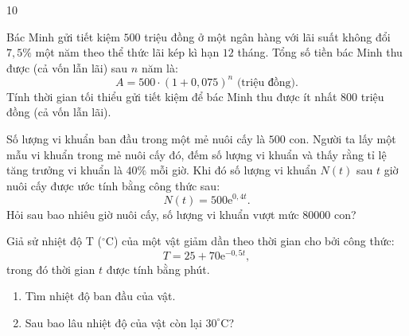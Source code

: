 \begin{indapan}{10}
\begin{bt}
	Bác Minh gửi tiết kiệm $500$ triệu đồng ở một ngân hàng với lãi suất không đổi $7{,}5 \%$ một năm theo thể thức lãi kép kì hạn $12$ tháng. Tổng số tiền bác Minh thu được (cả vốn lẫn lãi) sau $n$ năm là:
	$$A=500 \cdot(1+0{,}075)^n \text { (triệu đồng).}$$
	Tính thời gian tối thiểu gửi tiết kiệm để bác Minh thu được ít nhất $800$ triệu đồng (cả vốn lẫn lãi).
\end{bt}	

\begin{bt}
	Số lượng vi khuẩn ban đầu trong một mẻ nuôi cấy là $500$ con. Người ta lấy một mẫu vi khuẩn trong mẻ nuôi cấy đó, đếm số lượng vi khuẩn và thấy rằng tỉ lệ tăng trưởng vi khuẩn là $40 \%$ mỗi giờ. Khi đó số lượng vi khuẩn $N(t)$ sau $t$ giờ nuôi cấy được ước tính bằng công thức sau:
	$$N(t)=500\mathrm{e}^{0{,}4t}.$$
	Hỏi sau bao nhiêu giờ nuôi cấy, số lượng vi khuẩn vượt mức $80000$ con?
\end{bt}

\begin{bt}
	Giả sử nhiệt độ T ($^{\circ}$C) của một vật giảm dần theo thời gian cho bởi công thức:
	$$T=25+70\mathrm{e}^{-0{,}5t},$$ trong đó thời gian $t$ được tính bằng phút.
	\begin{enumerate}
		\item Tìm nhiệt độ ban đầu của vật.
		\item Sau bao lâu nhiệt độ của vật còn lại $30^{\circ}$C?
	\end{enumerate}
\end{bt}


\end{indapan}
